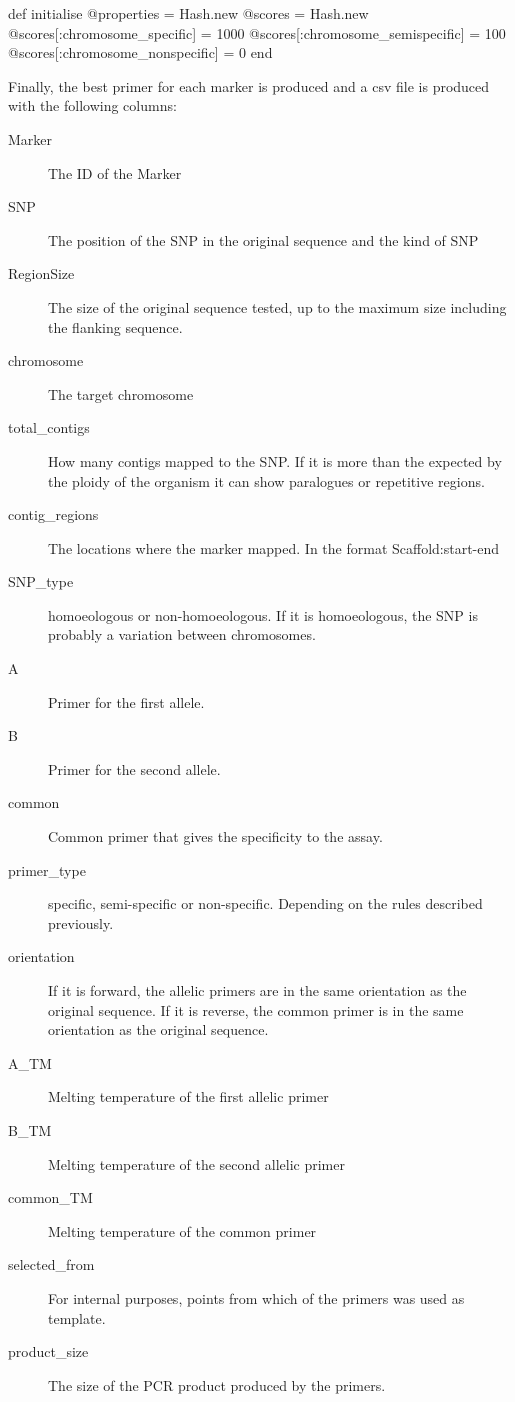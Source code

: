 \begin{code}[language=Ruby,caption={[\texttt{Bio::DB::Primer3::Primer3Record.initialize}]Initialisation of the \texttt{Bio::DB::Primer3::Primer3Record} class, including the default score weights}, label=lst:poly:defScore]
def initialise
  @properties = Hash.new
  @scores = Hash.new
  @scores[:chromosome_specific] = 1000
  @scores[:chromosome_semispecific] = 100
  @scores[:chromosome_nonspecific] = 0
end
\end{code}

Finally, the best primer for each marker is produced and a \acrshort{csv} file is produced with the following columns: 

\begin{description}
\item[Marker] The ID of the Marker
\item[SNP] The position of the SNP in the original sequence and the kind of SNP
\item[RegionSize] The size of the original sequence tested, up to the maximum size including the flanking sequence. 
\item[chromosome] The target chromosome
\item[total\_contigs] How many contigs mapped to the SNP. If it is more than the expected by the ploidy of the organism it can show paralogues or repetitive regions.
\item[contig\_regions] The locations where the marker mapped. In the format Scaffold:start-end
\item[SNP\_type] homoeologous or non-homoeologous. If it is homoeologous, the SNP is probably a variation between chromosomes. 
\item[A] Primer for the first allele.
\item[B] Primer for the second allele.
\item[common] Common primer that gives the specificity to the assay.
\item[primer\_type] specific, semi-specific or non-specific. Depending on the rules described previously. 
\item[orientation] If it is forward, the allelic primers are in the same orientation as the original sequence. If it is reverse, the common primer is in the same orientation as the original sequence.
\item[A\_TM] Melting temperature of the first allelic primer
\item[B\_TM] Melting temperature of the second allelic primer
\item[common\_TM] Melting temperature of the common primer
\item[selected\_from] For internal purposes, points from which of the primers was used as template. 
\item[product\_size] The size of the PCR product produced by the primers. 
\end{description}

